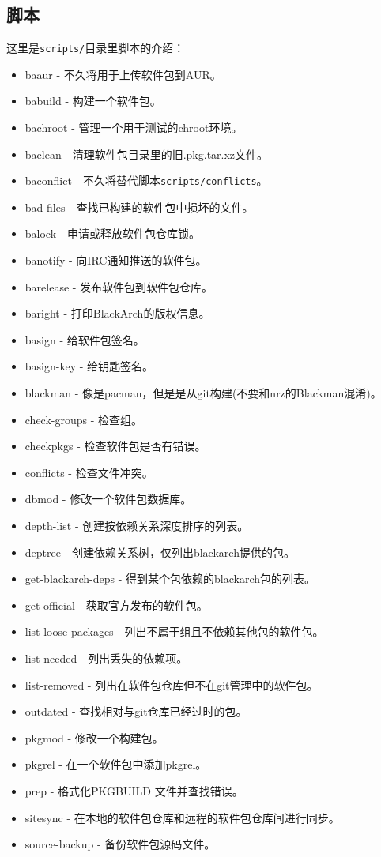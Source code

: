 \documentclass[a4paper, oneside, 11pt]{book}
\begin{document}
\subsection{脚本}
这里是\verb|scripts/|目录里脚本的介绍：

\begin{itemize}
\item baaur - 不久将用于上传软件包到AUR。
\item babuild - 构建一个软件包。
\item bachroot - 管理一个用于测试的chroot环境。
\item baclean - 清理软件包目录里的旧.pkg.tar.xz文件。
\item baconflict - 不久将替代脚本\verb|scripts/conflicts|。
\item bad-files - 查找已构建的软件包中损坏的文件。
\item balock - 申请或释放软件包仓库锁。
\item banotify - 向IRC通知推送的软件包。
\item barelease - 发布软件包到软件包仓库。
\item baright - 打印BlackArch的版权信息。
\item basign - 给软件包签名。
\item basign-key - 给钥匙签名。
\item blackman - 像是pacman，但是是从git构建(不要和nrz的Blackman混淆)。
\item check-groups - 检查组。
\item checkpkgs - 检查软件包是否有错误。
\item conflicts - 检查文件冲突。
\item dbmod - 修改一个软件包数据库。
\item depth-list - 创建按依赖关系深度排序的列表。
\item deptree - 创建依赖关系树，仅列出blackarch提供的包。
\item get-blackarch-deps - 得到某个包依赖的blackarch包的列表。
\item get-official - 获取官方发布的软件包。
\item list-loose-packages - 列出不属于组且不依赖其他包的软件包。
\item list-needed - 列出丢失的依赖项。
\item list-removed - 列出在软件包仓库但不在git管理中的软件包。
\item outdated - 查找相对与git仓库已经过时的包。
\item pkgmod - 修改一个构建包。
\item pkgrel - 在一个软件包中添加pkgrel。
\item prep - 格式化PKGBUILD 文件并查找错误。
\item sitesync - 在本地的软件包仓库和远程的软件包仓库间进行同步。
\item source-backup - 备份软件包源码文件。
\end{itemize}
\end{document}
